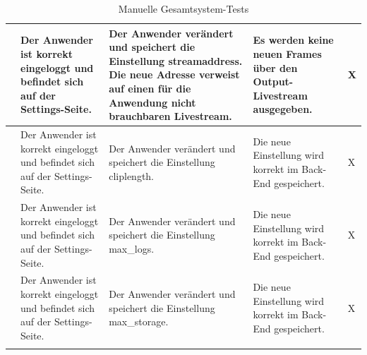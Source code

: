 \begin{longtable}{| p{} | p{} | p{} | p{} | p{} |}
	\stepcounter{SysTestNumber}\arabic{SysTestNumber} & Der Anwender ist korrekt eingeloggt und befindet sich auf der Settings-Seite. & Der Anwender verändert und speichert die Einstellung \glqq{}streamaddress\grqq{}. Die neue Adresse verweist auf einen für die Anwendung  nicht brauchbaren Livestream. & Es werden keine neuen Frames über den Output-Livestream ausgegeben. & X \\ \hline
	
	\stepcounter{SysTestNumber}\arabic{SysTestNumber} & Der Anwender ist korrekt eingeloggt und befindet sich auf der Settings-Seite. & Der Anwender verändert und speichert die Einstellung \glqq{}cliplength\grqq{}. & Die neue Einstellung wird korrekt im Back-End gespeichert. & X \\ \hline
	
	\stepcounter{SysTestNumber}\arabic{SysTestNumber} & Der Anwender ist korrekt eingeloggt und befindet sich auf der Settings-Seite. & Der Anwender verändert und speichert die Einstellung \glqq{}max\_logs\grqq{}. & Die neue Einstellung wird korrekt im Back-End gespeichert. & X \\ \hline
	
	\stepcounter{SysTestNumber}\arabic{SysTestNumber} & Der Anwender ist korrekt eingeloggt und befindet sich auf der Settings-Seite. & Der Anwender verändert und speichert die Einstellung \glqq{}max\_storage\grqq{}. & Die neue Einstellung wird korrekt im Back-End gespeichert. & X \\ \hline
	
	
	\caption{Manuelle Gesamtsystem-Tests}
	\label{tab:manuelle_gesamtsystem_tests}
\end{longtable}

